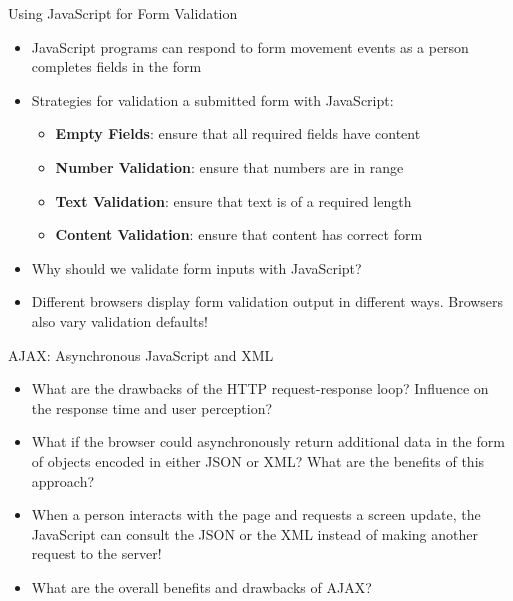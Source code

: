 \documentclass[14pt,aspectratio=169]{beamer}
\begin{document}
%
\begin{frame}{Using JavaScript for Form Validation}
  \begin{itemize}
    \item JavaScript programs can respond to form movement events as a person
      completes fields in the form
      \vspace*{-.15in}
    \item Strategies for validation a submitted form with JavaScript:
      \begin{itemize}
        \item {\bf Empty Fields}: ensure that all required fields have content
        \item {\bf Number Validation}: ensure that numbers are in range
        \item {\bf Text Validation}: ensure that text is of a required length
        \item {\bf Content Validation}: ensure that content has correct form
      \end{itemize}
      \vspace*{-.25in}
    \item Why should we validate form inputs with JavaScript?
      \vspace*{-.25in}
    \item Different browsers display form validation output in different ways.
      Browsers also vary validation defaults!
  \end{itemize}
\end{frame}

%
\begin{frame}{AJAX: Asynchronous JavaScript and XML}
  \begin{itemize}
    \item What are the drawbacks of the HTTP request-response loop? Influence on
      the response time and user perception?
      \vspace*{-.35in}
    \item What if the browser could asynchronously return additional data in the
      form of objects encoded in either JSON or XML? What are the benefits of
      this approach?
      \vspace*{-.15in}
    \item When a person interacts with the page and requests a screen update,
      the JavaScript can consult the JSON or the XML instead of making another
      request to the server!
      \vspace*{-.15in}
    \item What are the overall benefits and drawbacks of AJAX?
  \end{itemize}
\end{frame}
\end{document}
